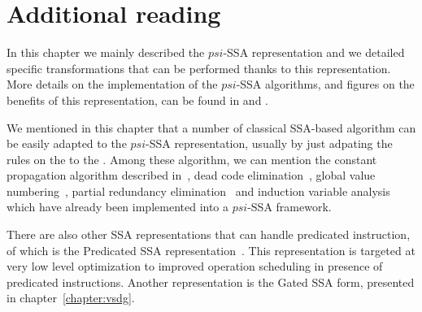 \section{Additional reading}

In this chapter we mainly described the $psi$-SSA representation and we detailed specific transformations that can be performed thanks to this representation. More details on the implementation of the $psi$-SSA algorithms, and figures on the benefits of this representation, can be found in \cite{Stoutchinin:2001:MICRO} and \cite{Ferriere:2007:SCOPES}.

We mentioned in this chapter that a number of classical SSA-based algorithm can be easily adapted to the $psi$-SSA representation, usually by just adpating the rules on the \phifuns to the \psifuns. Among these algorithm, we can mention the constant propagation algorithm described in~\cite{WZ91}, dead code elimination~\cite{morgan98}, global value numbering~\cite{Cli95}, partial redundancy elimination~\cite{CCK+97} and induction variable analysis~\cite{Wolfe92} which have already been implemented into a $psi$-SSA framework.

There are also other SSA representations that can handle predicated instruction, of which is the Predicated SSA representation~\cite{Carter:PACT99}. This representation is targeted at very low level optimization to improved operation scheduling in presence of predicated instructions. Another representation is the Gated SSA form, presented in chapter~\ref{chapter:vsdg}.
